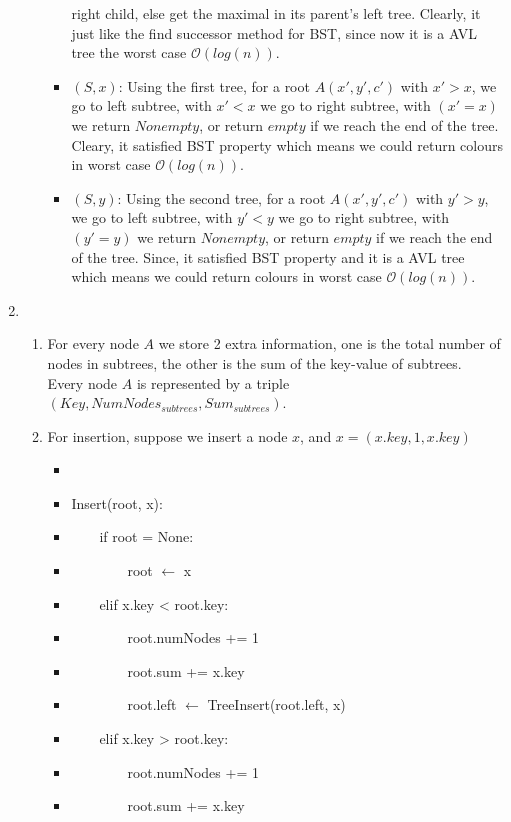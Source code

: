 \documentclass[11pt,twoside]{article}
\begin{document}
\begin{enumerate}[leftmargin=0pt]
\begin{enumerate}
\begin{itemize}
						right child, else get the maximal in its parent's left tree. Clearly, it just like the find successor method for BST, since now it is a AVL tree the worst case $\mathcal{O}(log(n))$.
				\item	{}$(S, x)$: Using the first tree, for a root $A(x', y', c')$ with $x'>x$, we go to left subtree, with $x'<x$ we go to right subtree, with $(x'=x)$ we return $Nonempty$, or return $empty$ if we reach 
						the end of the tree. Cleary, it satisfied BST property which means we could return colours in worst case $\mathcal{O}(log(n))$.
				\item	{}$(S, y)$: Using the second tree, for a root $A(x', y', c')$ with $y'>y$, we go to left subtree, with $y'< y$ we go to right subtree, with $(y' = y)$ we return $Nonempty$, or return $empty$ if 
						we reach the end of the tree. Since, it satisfied BST property and it is a AVL tree which means we could return colours in worst case $\mathcal{O}(log(n))$.
			\end{itemize}
	\end{enumerate}
\item 
	\begin{enumerate}
		\item For every node $A$ we store 2 extra information, one is the total number of nodes in subtrees, 
		the other is the sum of the key-value of subtrees. \\ 
		Every node $A$ is represented by a triple $(Key, NumNodes_{subtrees}, Sum_{subtrees})$. \\
		\item For insertion, suppose we insert a node $x$, and $x = (x.key, 1 , x.key)$ 
			\begin{itemize}  [label={}]
			\item
			\item Insert(root, x):
			\item \ \ \ \ if root = None: 
			\item \ \ \ \ \ \ \ \ root $\leftarrow$ x
			\item \ \ \ \ elif x.key < root.key:
			\item \ \ \ \ \ \ \ \ root.numNodes += 1
			\item \ \ \ \ \ \ \ \ root.sum += x.key
			\item \ \ \ \ \ \ \ \ root.left $\leftarrow$ TreeInsert(root.left, x)
			\item \ \ \ \ elif x.key > root.key:
			\item \ \ \ \ \ \ \ \ root.numNodes += 1
			\item \ \ \ \ \ \ \ \ root.sum += x.key

\end{itemize}
\end{enumerate}
\end{enumerate}
\end{document}
